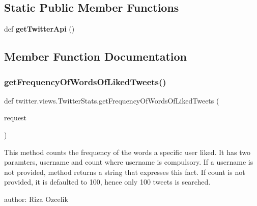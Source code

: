 \subsection*{Static Public Member Functions}
\begin{DoxyCompactItemize}
\item 
\mbox{\label{classtwitter_1_1views_1_1_twitter_stats_aa259d1356864ab08580a065ea7228ab6}} 
def {\bfseries get\+Twitter\+Api} ()
\end{DoxyCompactItemize}


\subsection{Member Function Documentation}
\mbox{\label{classtwitter_1_1views_1_1_twitter_stats_a880c4da522b5f91c401c54861dc3ad12}} 
\subsubsection{\texorpdfstring{get\+Frequency\+Of\+Words\+Of\+Liked\+Tweets()}{getFrequencyOfWordsOfLikedTweets()}}
{\footnotesize\ttfamily def twitter.\+views.\+Twitter\+Stats.\+get\+Frequency\+Of\+Words\+Of\+Liked\+Tweets (\begin{DoxyParamCaption}\item[{}]{request }\end{DoxyParamCaption})}

\begin{DoxyVerb}This method counts the frequency of the words a specific user liked.
It has two paramters, username and count where username is compulsory.
If a username is not provided, method returns a string that expresses this fact.
If count is not provided, it is defaulted to 100, hence only 100 tweets is searched.

author: Riza Ozcelik
\end{DoxyVerb}
 \mbox{\label{classtwitter_1_1views_1_1_twitter_stats_a1b25912ecee8b0ee19af0948378a57fa}} 
